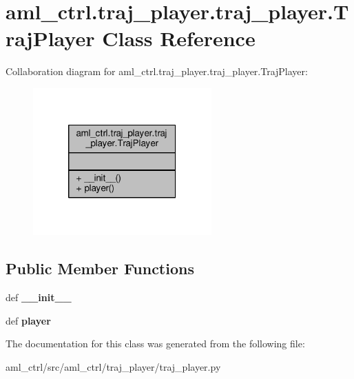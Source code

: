 \hypertarget{classaml__ctrl_1_1traj__player_1_1traj__player_1_1_traj_player}{\section{aml\-\_\-ctrl.\-traj\-\_\-player.\-traj\-\_\-player.\-Traj\-Player Class Reference}
\label{classaml__ctrl_1_1traj__player_1_1traj__player_1_1_traj_player}
}


Collaboration diagram for aml\-\_\-ctrl.\-traj\-\_\-player.\-traj\-\_\-player.\-Traj\-Player\-:\nopagebreak
\begin{figure}[H]
\begin{center}
\leavevmode
\includegraphics[width=194pt]{classaml__ctrl_1_1traj__player_1_1traj__player_1_1_traj_player__coll__graph}
\end{center}
\end{figure}
\subsection*{Public Member Functions}
\begin{DoxyCompactItemize}
\item 
\hypertarget{classaml__ctrl_1_1traj__player_1_1traj__player_1_1_traj_player_a904f8610ebf2ca747afb7c9829dd2284}{def {\bfseries \-\_\-\-\_\-init\-\_\-\-\_\-}}\label{classaml__ctrl_1_1traj__player_1_1traj__player_1_1_traj_player_a904f8610ebf2ca747afb7c9829dd2284}

\item 
\hypertarget{classaml__ctrl_1_1traj__player_1_1traj__player_1_1_traj_player_a9332291fa8ab718dfc8e2434b4763321}{def {\bfseries player}}\label{classaml__ctrl_1_1traj__player_1_1traj__player_1_1_traj_player_a9332291fa8ab718dfc8e2434b4763321}

\end{DoxyCompactItemize}


The documentation for this class was generated from the following file\-:\begin{DoxyCompactItemize}
\item 
aml\-\_\-ctrl/src/aml\-\_\-ctrl/traj\-\_\-player/traj\-\_\-player.\-py\end{DoxyCompactItemize}
